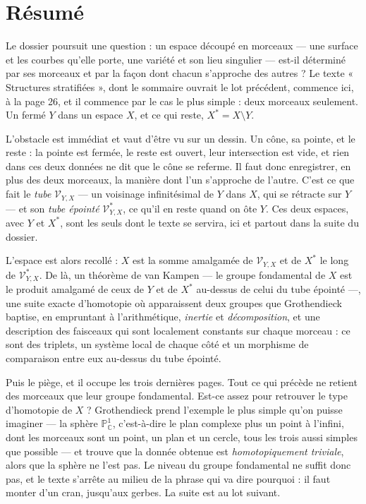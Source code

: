 \documentclass[11pt,a4paper]{article}
\begin{document}
\section*{Résumé}

\begin{resume}
Le dossier poursuit une question : un espace découpé en morceaux — une surface
et les courbes qu'elle porte, une variété et son lieu singulier — est-il
déterminé par ses morceaux et par la façon dont chacun s'approche des autres ?
Le texte « Structures stratifiées », dont le sommaire ouvrait le lot précédent,
commence ici, à la page 26, et il commence par le cas le plus simple : deux
morceaux seulement. Un fermé $Y$ dans un espace $X$, et ce qui reste,
$X^{*} = X \setminus Y$.

L'obstacle est immédiat et vaut d'être vu sur un dessin. Un cône, sa pointe, et
le reste : la pointe est fermée, le reste est ouvert, leur intersection est
vide, et rien dans ces deux données ne dit que le cône se referme. Il faut donc
enregistrer, en plus des deux morceaux, la manière dont l'un s'approche de
l'autre. C'est ce que fait le \emph{tube} $\mathcal{V}_{Y,X}$ — un voisinage
infinitésimal de $Y$ dans $X$, qui se rétracte sur $Y$ — et son \emph{tube
épointé} $\mathcal{V}^{*}_{Y,X}$, ce qu'il en reste quand on ôte $Y$. Ces deux
espaces, avec $Y$ et $X^{*}$, sont les seuls dont le texte se servira, ici et
partout dans la suite du dossier.

L'espace est alors recollé : $X$ est la somme amalgamée de $\mathcal{V}_{Y,X}$
et de $X^{*}$ le long de $\mathcal{V}^{*}_{Y,X}$. De là, un théorème de van
Kampen — le groupe fondamental de $X$ est le produit amalgamé de ceux de $Y$ et
de $X^{*}$ au-dessus de celui du tube épointé —, une suite exacte d'homotopie où
apparaissent deux groupes que Grothendieck baptise, en empruntant à
l'arithmétique, \emph{inertie} et \emph{décomposition}, et une description des
faisceaux qui sont localement constants sur chaque morceau : ce sont des
triplets, un système local de chaque côté et un morphisme de comparaison entre
eux au-dessus du tube épointé.

Puis le piège, et il occupe les trois dernières pages. Tout ce qui précède ne
retient des morceaux que leur groupe fondamental. Est-ce assez pour retrouver le
type d'homotopie de $X$ ? Grothendieck prend l'exemple le plus simple qu'on
puisse imaginer — la sphère $\mathbb{P}^{1}_{\mathbb{C}}$, c'est-à-dire le plan
complexe plus un point à l'infini, dont les morceaux sont un point, un plan et
un cercle, tous les trois aussi simples que possible — et trouve que la donnée
obtenue est \emph{homotopiquement triviale}, alors que la sphère ne l'est pas.
Le niveau du groupe fondamental ne suffit donc pas, et le texte s'arrête au
milieu de la phrase qui va dire pourquoi : il faut monter d'un cran, jusqu'aux
gerbes. La suite est au lot suivant.


\end{resume}
\end{document}
